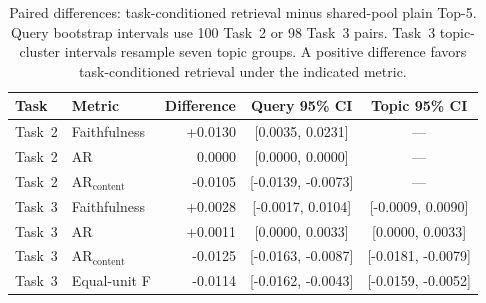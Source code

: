 \begin{table}[ht]
\centering
\scriptsize
\caption{Paired differences: task-conditioned retrieval minus shared-pool plain Top-5. Query bootstrap intervals use 100 Task~2 or 98 Task~3 pairs. Task~3 topic-cluster intervals resample seven topic groups. A positive difference favors task-conditioned retrieval under the indicated metric.}
\label{tab:single-pipeline-rag-ci}
\setlength{\tabcolsep}{4pt}
\renewcommand{\arraystretch}{1.08}
\begin{tabular}{@{}l l r c c@{}}
\toprule
\textbf{Task} & \textbf{Metric} & \textbf{Difference} & \textbf{Query 95\% CI} & \textbf{Topic 95\% CI} \\
\midrule
Task~2 & Faithfulness & +0.0130 & [0.0035, 0.0231] & --- \\
Task~2 & AR & 0.0000 & [0.0000, 0.0000] & --- \\
Task~2 & $\mathrm{AR}_{\mathrm{content}}$ & -0.0105 & [-0.0139, -0.0073] & --- \\
\addlinespace
Task~3 & Faithfulness & +0.0028 & [-0.0017, 0.0104] & [-0.0009, 0.0090] \\
Task~3 & AR & +0.0011 & [0.0000, 0.0033] & [0.0000, 0.0033] \\
Task~3 & $\mathrm{AR}_{\mathrm{content}}$ & -0.0125 & [-0.0163, -0.0087] & [-0.0181, -0.0079] \\
Task~3 & Equal-unit F & -0.0114 & [-0.0162, -0.0043] & [-0.0159, -0.0052] \\
\bottomrule
\end{tabular}
\end{table}
